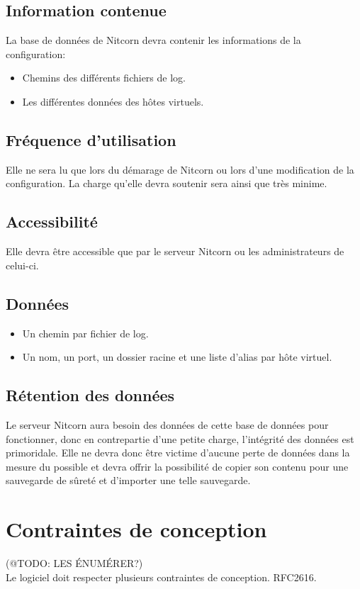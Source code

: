 \documentclass{scrreprt}
\begin{document}
\subsection{Information contenue}
La base de données de Nitcorn devra contenir les informations de la configuration:
\begin{itemize}
	\item Chemins des différents fichiers de log.
	\item Les différentes données des hôtes virtuels.
\end{itemize}
\subsection{Fréquence d'utilisation}
Elle ne sera lu que lors du démarage de Nitcorn ou lors d'une modification de la configuration.
La charge qu'elle devra soutenir sera ainsi que très minime.
\subsection{Accessibilité}
Elle devra être accessible que par le serveur Nitcorn ou les administrateurs de celui-ci.
\subsection{Données}
\begin{itemize}
	\item Un chemin par fichier de log.
	\item Un nom, un port, un dossier racine et une liste d'alias par hôte virtuel.
\end{itemize}
\subsection{Rétention des données}
Le serveur Nitcorn aura besoin des données de cette base de données pour fonctionner, donc en contrepartie d'une petite charge, l'intégrité des données est primoridale. Elle ne devra donc être victime d'aucune perte de données dans la mesure du possible et devra offrir la possibilité de copier son contenu pour une sauvegarde de sûreté et d'importer une telle sauvegarde.

\section{Contraintes de conception}(@TODO: LES ÉNUMÉRER?)\\ Le logiciel doit respecter plusieurs contraintes de conception. RFC2616.
\end{document}
